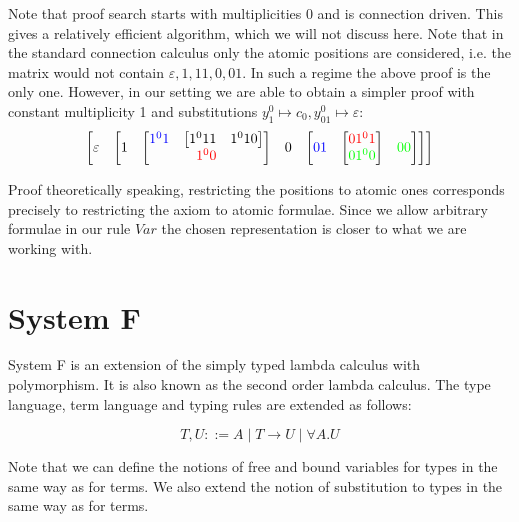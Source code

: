 \documentclass[11pt]{article}
\theoremstyle{definition}
\theoremstyle{definition}
\theoremstyle{definition}
\theoremstyle{definition}
\theoremstyle{definition}
\theoremstyle{definition}
\theoremstyle{definition}
\begin{document}
	Note that proof search starts with multiplicities $0$ and is connection driven. This gives a relatively efficient algorithm, which we will not discuss here. Note that in the standard connection calculus only the atomic positions are considered, i.e. the matrix would not contain $\varepsilon, 1, 11, 0, 01$. In such a regime the above proof is the only one. However, in our setting we are able to obtain a simpler proof with constant multiplicity 1 and substitutions $y_1^0\mapsto c_0, y_{01}^0\mapsto \varepsilon$:
	\[
		\begin{bmatrix}
			\varepsilon &
			\begin{bmatrix}
				1 &
				\begin{bmatrix}
					\begin{matrix}
						{\color{blue}1^01} &
						\begin{bmatrix}
							{1^011} & {1^010}
						\end{bmatrix}
					\end{matrix} \\ {\color{red}1^00}
				\end{bmatrix} &
				0 &
				\begin{bmatrix}
					{\color{blue}01} &
					\begin{bmatrix}
						{\color{red}01^01} \\ {\color{green}01^00}
					\end{bmatrix} &
					{\color{green}00}
				\end{bmatrix}
			\end{bmatrix}
		\end{bmatrix}
	\]

	Proof theoretically speaking, restricting the positions to atomic ones corresponds precisely to restricting the axiom to atomic formulae. Since we allow arbitrary formulae in our rule $Var$ the chosen representation is closer to what we are working with.


	\section{System F}
	 
	System F is an extension of the simply typed lambda calculus with polymorphism. It is also known as the second order lambda calculus. The type language, term language and typing rules are extended as follows:

	\[T, U ::= A\mid T\to U\mid \forall A. U\]

	Note that we can define the notions of free and bound variables for types in the same way as for terms. We also extend the notion of substitution to types in the same way as for terms.
\end{document}
